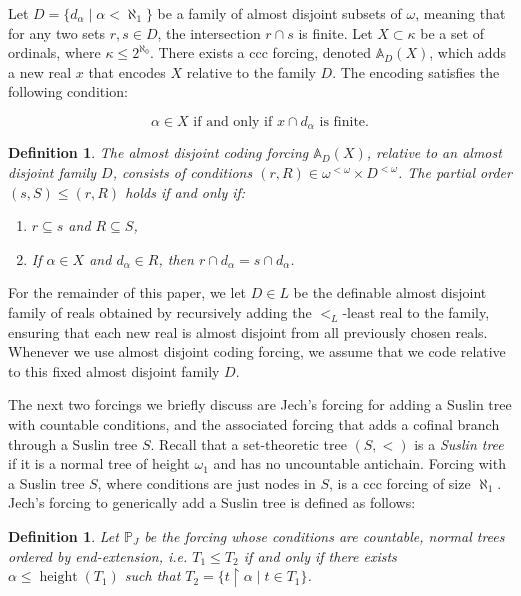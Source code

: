 \documentclass[a4paper,11pt]{article}
\newtheorem{definition}[theorem]{Definition}
\newcommand{\forceP}{\mathbb{P}}
\begin{document}
Let \( D = \{ d_{\alpha} \mid \alpha < \aleph_1 \} \) be a family of almost disjoint subsets of \( \omega \), meaning that for any two sets \( r, s \in D \), the intersection \( r \cap s \) is finite. Let \( X \subset \kappa \) be a set of ordinals, where \( \kappa \leq 2^{\aleph_0} \). There exists a ccc forcing, denoted \( \mathbb{A}_D(X) \), which adds a new real \( x \) that encodes \( X \) relative to the family \( D \). The encoding satisfies the following condition:

\[
\alpha \in X \text{ if and only if } x \cap d_{\alpha} \text{ is finite.}
\]

\begin{definition}
The almost disjoint coding forcing \( \mathbb{A}_D(X) \), relative to an almost disjoint family \( D \), consists of conditions \( (r, R) \in \omega^{<\omega} \times D^{<\omega} \). The partial order \( (s, S) \le (r, R) \) holds if and only if:
\begin{enumerate}
  \item \( r \subseteq s \) and \( R \subseteq S \),
  \item If \( \alpha \in X \) and \( d_{\alpha} \in R \), then \( r \cap d_{\alpha} = s \cap d_{\alpha} \).
\end{enumerate}
\end{definition}

For the remainder of this paper, we let \( D \in L \) be the definable almost disjoint family of reals obtained by recursively adding the \( <_L \)-least real to the family, ensuring that each new real is almost disjoint from all previously chosen reals. Whenever we use almost disjoint coding forcing, we assume that we code relative to this fixed almost disjoint family \( D \).

The next two forcings we briefly discuss are Jech's forcing for adding a Suslin tree with countable conditions, and the associated forcing that adds a cofinal branch through a Suslin tree \( S \). Recall that a set-theoretic tree \( (S, <) \) is a \emph{Suslin tree} if it is a normal tree of height \( \omega_1 \) and has no uncountable antichain. Forcing with a Suslin tree \( S \), where conditions are just nodes in \( S \), is a ccc forcing of size \( \aleph_1 \). Jech’s forcing to generically add a Suslin tree is defined as follows:

\begin{definition}
Let \( \forceP_J \) be the forcing whose conditions are countable, normal trees ordered by end-extension, i.e. \( T_1 \le T_2 \) if and only if there exists \( \alpha \leq \operatorname{height}(T_1) \) such that \( T_2 = \{ t \upharpoonright \alpha \mid t \in T_1 \} \).
\end{definition}
\end{document}
